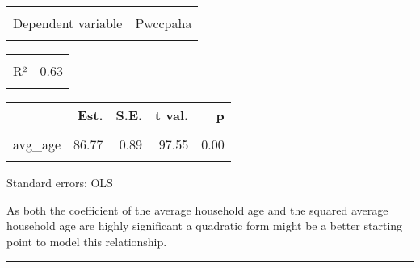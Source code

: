 \documentclass[
]{article}
\begin{document}
\begin{table}[!h]
\centering
\begin{tabular}{lr}
\toprule
\cellcolor{gray!6}{Observations} & \cellcolor{gray!6}{12520}\\
Dependent variable & Pwccpaha\\
\cellcolor{gray!6}{Type} & \cellcolor{gray!6}{OLS linear regression}\\
\bottomrule
\end{tabular}
\end{table} \begin{table}[!h]
\centering
\begin{tabular}{lr}
\toprule
\cellcolor{gray!6}{F(2,12517)} & \cellcolor{gray!6}{10811.08}\\
R² & 0.63\\
\cellcolor{gray!6}{Adj. R²} & \cellcolor{gray!6}{0.63}\\
\bottomrule
\end{tabular}
\end{table} \begin{table}[!h]
\centering
\begin{threeparttable}
\begin{tabular}{lrrrr}
\toprule
  & Est. & S.E. & t val. & p\\
\midrule
\cellcolor{gray!6}{(Intercept)} & \cellcolor{gray!6}{-74.92} & \cellcolor{gray!6}{18.00} & \cellcolor{gray!6}{-4.16} & \cellcolor{gray!6}{0.00}\\
avg\_age & 86.77 & 0.89 & 97.55 & 0.00\\
\cellcolor{gray!6}{avg\_age\_2} & \cellcolor{gray!6}{-0.70} & \cellcolor{gray!6}{0.01} & \cellcolor{gray!6}{-74.86} & \cellcolor{gray!6}{0.00}\\
\bottomrule
\end{tabular}
\begin{tablenotes}
\item Standard errors: OLS
\end{tablenotes}
\end{threeparttable}
\end{table}

As both the coefficient of the average household age and the squared
average household age are highly significant a quadratic form might be a
better starting point to model this relationship.

\begin{center}\rule{0.5\linewidth}{0.5pt}\end{center}
\end{document}
